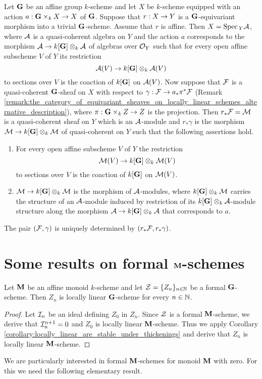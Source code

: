 \begin{remark}\label{remark:equivariant_scheme_affine_over_trivial_scheme}
Let $\mathbf{G}$ be an affine group $k$-scheme and let $X$ be $k$-scheme equipped with an action $a:\mathbf{G}\times_k X\rightarrow X$ of $\mathbf{G}$. Suppose that $r:X\rightarrow Y$ is a $\mathbf{G}$-equivariant morphism into a trivial $\mathbf{G}$-scheme. Assume that $r$ is affine. Then $X = \mathrm{Spec}\,_Y{\mathcal A}$, where ${\mathcal A}$ is a quasi-coherent algebra on $Y$ and the action $a$ corresponds to the morphism ${\mathcal A}\rightarrow k[\mathbf{G}]\otimes_k{\mathcal A}$ of algebras over ${\mathcal O}_Y$ such that for every open affine subscheme $V$ of $Y$ its restriction
$${\mathcal A}(V) \rightarrow k[\mathbf{G}]\otimes_k{\mathcal A}(V)$$
to sections over $V$ is the coaction of $k[\mathbf{G}]$ on ${\mathcal A}(V)$. Now suppose that ${\mathcal F}$ is a quasi-coherent $\mathbf{G}$-sheaf on $X$ with respect to $\gamma:{\mathcal F}\rightarrow a_*\pi^*{\mathcal F}$ (Remark \ref{remark:the_category_of_equivariant_sheaves_on_locally_linear_schemes_alternative_description}), where $\pi:\mathbf{G}\times_kZ\rightarrow Z$ is the projection. Then $r_*{\mathcal F} = {\mathcal M}$ is a quasi-coherent sheaf on $Y$ which is an ${\mathcal A}$-module and $r_*\gamma$ is the morphism ${\mathcal M}\rightarrow k[\mathbf{G}]\otimes_k{\mathcal M}$ of quasi-coherent on $Y$ such that the following assertions hold.
\begin{enumerate}[label=\textbf{(\arabic*)}, leftmargin=3.0em]
\item For every open affine subscheme $V$ of $Y$ the restriction
$${\mathcal M}(V) \rightarrow k[\mathbf{G}]\otimes_k{\mathcal M}(V)$$
to sections over $V$ is the coaction of $k[\mathbf{G}]$ on ${\mathcal M}(V)$.
\item ${\mathcal M} \rightarrow k[\mathbf{G}]\otimes_k{\mathcal M}$ is the morphism of ${\mathcal A}$-modules, where $k[\mathbf{G}]\otimes_k{\mathcal M}$ carries the structure of an ${\mathcal A}$-module induced by restriction of its $k[\mathbf{G}]\otimes_k{\mathcal A}$-module structure along the morphism ${\mathcal A}\rightarrow k[\mathbf{G}]\otimes_k{\mathcal A}$ that corresponds to $a$.
\end{enumerate}
The pair $({\mathcal F},\gamma)$ is uniquely determined by $(r_*{\mathcal F},r_*\gamma)$.
\end{remark}

\section{Some results on formal $\mathbf{M}$-schemes}

\begin{corollary}\label{corollary:each_formal_scheme_consists_of_locally_linear_schemes_if_group_is_affine}
Let $\mathbf{M}$ be an affine monoid $k$-scheme and let ${\mathcal Z} = \{Z_n\}_{n\in {\mathbb N}}$ be a formal $\mathbf{G}$-scheme. Then $Z_n$ is locally linear $\mathbf{G}$-scheme for every $n\in {\mathbb N}$.
\end{corollary}
\begin{proof}
Let ${\mathcal I}_n$ be an ideal defining $Z_0$ in $Z_n$. Since ${\mathcal Z}$ is a formal $\mathbf{M}$-scheme, we derive that ${\mathcal I}_n^{n+1} = 0$ and $Z_0$ is locally linear $\mathbf{M}$-scheme. Thus we apply Corollary \ref{corollary:locally_linear_are_stable_under_thickenings} and derive that $Z_n$ is locally linear $\mathbf{M}$-scheme.
\end{proof}
\noindent
We are particularly interested in formal $\mathbf{M}$-schemes for monoid $\mathbf{M}$ with zero. For this we need the following elementary result.

